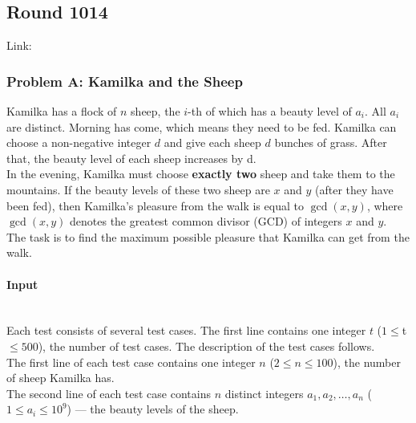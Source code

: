 \documentclass{article}
\begin{document}
\begin{lstlisting} 

\end{lstlisting}


\subsection{Round 1014}

Link: \url{}

\subsubsection{Problem A: Kamilka and the Sheep}

Kamilka has a flock of $n$ sheep, the $i$-th of which has a beauty level of $a_i$. All $a_i$ are distinct. Morning has come, which means they need to be fed. Kamilka can choose a non-negative integer $d$ and give each sheep $d$ bunches of grass. After that, the beauty level of each sheep increases by d. \\

In the evening, Kamilka must choose \textbf{exactly two} sheep and take them to the mountains. If the beauty levels of these two sheep are $x$ and $y$ (after they have been fed), then Kamilka's pleasure from the walk is equal to $\gcd(x, y)$, where $\gcd(x, y)$ denotes the greatest common divisor (GCD) of integers $x$ and $y$.
\\
The task is to find the maximum possible pleasure that Kamilka can get from the walk.

\paragraph{Input} \mbox{} \\

Each test consists of several test cases. The first line contains one integer $t$
 ($1 \leq $t$ \leq 500$), the number of test cases. The description of the test cases follows.
\\
The first line of each test case contains one integer $n$
 ($2 \leq n \leq 100$), the number of sheep Kamilka has.\\

The second line of each test case contains $n$
 distinct integers $a_1, a_2, …, a_n$ ($1 \leq a_i \leq 10^9$)
 — the beauty levels of the sheep.\\
\end{document}
